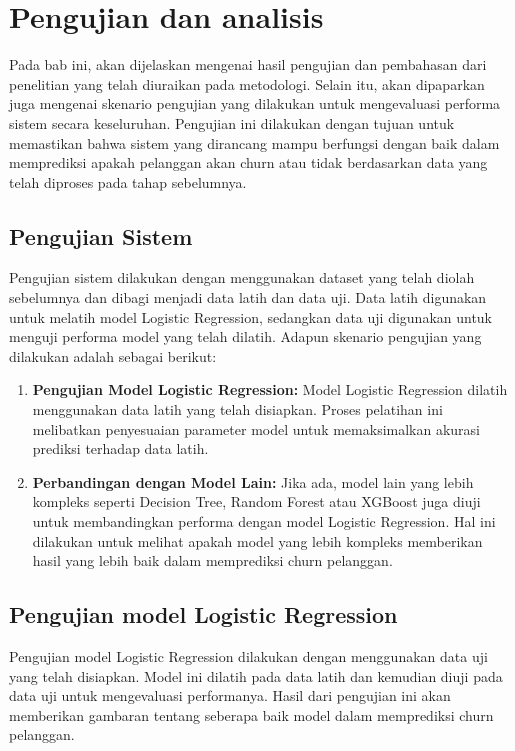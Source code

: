 \newpage

\section{Pengujian dan analisis}
Pada bab ini, akan dijelaskan mengenai hasil pengujian dan pembahasan dari penelitian yang telah diuraikan pada metodologi. Selain itu, akan dipaparkan juga mengenai skenario pengujian yang dilakukan untuk mengevaluasi performa sistem secara keseluruhan. Pengujian ini dilakukan dengan tujuan untuk memastikan bahwa sistem yang dirancang mampu berfungsi dengan baik dalam memprediksi apakah pelanggan akan churn atau tidak berdasarkan data yang telah diproses pada tahap sebelumnya.


\subsection{Pengujian Sistem}
Pengujian sistem dilakukan dengan menggunakan dataset yang telah diolah sebelumnya dan dibagi menjadi data latih dan data uji. Data latih digunakan untuk melatih model Logistic Regression, sedangkan data uji digunakan untuk menguji performa model yang telah dilatih. Adapun skenario pengujian yang dilakukan adalah sebagai berikut:
\begin{enumerate}
    \item \textbf{Pengujian Model Logistic Regression:} Model Logistic Regression dilatih menggunakan data latih yang telah disiapkan. Proses pelatihan ini melibatkan penyesuaian parameter model untuk memaksimalkan akurasi prediksi terhadap data latih.
    \item \textbf{Perbandingan dengan Model Lain:} Jika ada, model lain yang lebih kompleks seperti Decision Tree, Random Forest atau XGBoost juga diuji untuk membandingkan performa dengan model Logistic Regression. Hal ini dilakukan untuk melihat apakah model yang lebih kompleks memberikan hasil yang lebih baik dalam memprediksi churn pelanggan.
\end{enumerate}

\subsection{Pengujian model Logistic Regression}
Pengujian model Logistic Regression dilakukan dengan menggunakan data uji yang telah disiapkan. Model ini dilatih pada data latih dan kemudian diuji pada data uji untuk mengevaluasi performanya. Hasil dari pengujian ini akan memberikan gambaran tentang seberapa baik model dalam memprediksi churn pelanggan.


